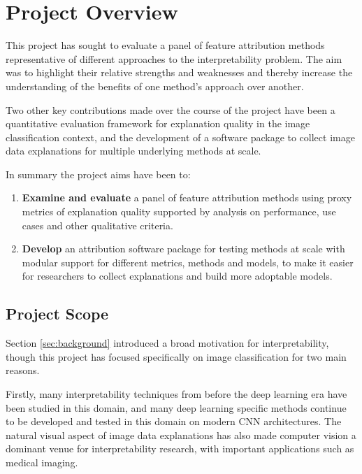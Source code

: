 \documentclass[main]{subfiles}
\begin{document}

\section{Project Overview}
This project has sought to evaluate a panel of feature attribution methods representative of different approaches to the interpretability problem. The aim was to highlight their relative strengths and weaknesses and thereby increase the understanding of the benefits of one method's approach over another.

Two other  key contributions made over the course of the project have been a quantitative evaluation framework for explanation quality in the image classification context, and the development of a software package to collect image data explanations for multiple underlying methods at scale.

In summary the project aims have been to:
\begin{enumerate}
	\item \textbf{Examine and evaluate} a panel of feature attribution methods using proxy metrics of explanation quality supported by analysis on performance, use cases and other qualitative criteria.

	\item \textbf{Develop} an attribution software package for testing methods at scale with modular support for different metrics, methods and models, to make it easier for researchers to collect explanations and build more adoptable models.
	
\end{enumerate}


\newpage

\subsection*{Project Scope} \label{sec:intro_scope}

Section \ref{sec:background} introduced a broad motivation for interpretability, though this project has focused specifically on image classification for two main reasons.

Firstly, many interpretability techniques from before the deep learning era have been studied in this domain, and many deep learning specific methods continue to be developed and tested in this domain on modern CNN architectures. The natural visual aspect of image data explanations has also made computer vision a dominant venue for interpretability research, with important applications such as medical imaging.
 
\end{document}
